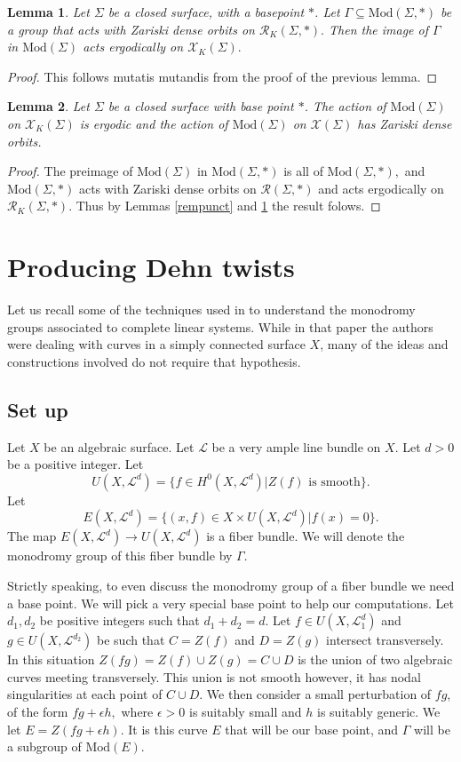 \documentclass{article}
\newcommand{\XX}{\mathcal{X}}
\newcommand{\Rc}{\mathcal{R}}
\newcommand{\Lc}{\mathcal{L}}
\newcommand{\Mod}{\textrm{Mod}}
\newtheorem{lemma}{Lemma}[theorem]
\begin{document}
\begin{lemma}\label{rempuncterg}
    Let $\Sigma$ be a closed surface, with a basepoint $*$. Let $\Gamma \subseteq \Mod(\Sigma,*) $ be a group that acts with Zariski dense orbits on $\Rc_K(\Sigma, *).$ Then the image of $\Gamma$ in $\Mod(\Sigma)$ acts ergodically on $\XX_K(\Sigma).$
\end{lemma}
\begin{proof}
    This follows mutatis mutandis from the proof of the previous lemma.
\end{proof}

\begin{lemma}\label{wholemcg}
    Let $\Sigma$ be a closed surface with base point $*$. The action of $\Mod(\Sigma)$ on $\XX_K(\Sigma)$ is ergodic and the action of $\Mod(\Sigma)$ on $\XX(\Sigma)$ has Zariski dense orbits.
\end{lemma}
\begin{proof}
    The preimage of $\Mod(\Sigma)$ in $\Mod(\Sigma, *)$ is all of $\Mod(\Sigma, *),$ and $\Mod(\Sigma,*)$ acts with Zariski dense orbits on $\Rc(\Sigma, *)$ and acts ergodically on $\Rc_K(\Sigma, *).$  Thus by Lemmas \ref{rempunct} and \ref{rempuncterg} the result folows.
\end{proof}
\section{Producing Dehn twists}

Let us recall some of the techniques used in \cite{BS}  to understand the monodromy groups associated to complete linear systems. While in that paper the authors were dealing with curves in a simply connected surface $X$, many of the ideas and constructions involved do not require that hypothesis.
\subsection{Set up}
Let $X$ be an algebraic surface. Let $\Lc$ be a very ample line bundle on $X$. Let $d >0$ be a positive integer. Let $$U(X, \Lc^d)  = \{f \in H^0(X, \Lc^d)| Z(f) \textrm{ is smooth}\}.$$ Let $$E(X, \Lc^d) =\{ (x,f) \in X \times U(X, \Lc^d)| f(x) =0\}.$$The map $E(X ,\Lc^d) \to U(X, \Lc^d)$ is a fiber bundle. We will denote the monodromy group of this fiber bundle by $\Gamma$.

Strictly speaking, to even discuss the monodromy group of a fiber bundle we need a base point. We will pick a very special base point to help our computations. Let $d_1, d_2$ be positive integers such that $d_1 + d_2 = d.$ Let $f \in U(X, \Lc^d_1)$ and $g \in U(X, \Lc^{d_2})$ be such that $C = Z(f)  $ and $D = Z(g)$ intersect transversely. In this situation $Z(fg) = Z(f) \cup Z(g) = C \cup D$ is the union of two algebraic curves meeting transversely. This union is not smooth however, it has nodal singularities at each point of $C \cup D.$ We then consider a small perturbation of $fg$, of the form $fg + \epsilon h,$ where $\epsilon>0$ is suitably small and $h$ is suitably generic. We let $E = Z(fg + \epsilon h).$ It is this curve $E$ that will be our base point, and $\Gamma$ will be a subgroup of $\Mod(E).$
\end{document}
